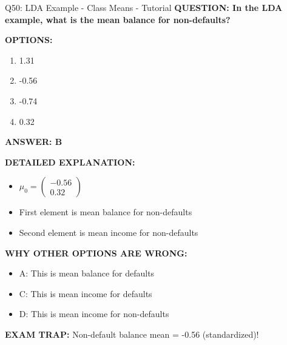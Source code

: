 \documentclass[8pt]{beamer}
\begin{document}
\begin{frame}{Q50: LDA Example - Class Means - Tutorial}
	\fontsize{6.5}{7.5}\selectfont
	\textbf{QUESTION: In the LDA example, what is the mean balance for non-defaults?}
	
	\vspace{0.1cm}
	\textbf{OPTIONS:}
	\begin{enumerate}
		\item 1.31
		\item -0.56
		\item -0.74
		\item 0.32
	\end{enumerate}
	
	\vspace{0.1cm}
	\textcolor{myblue}{\textbf{ANSWER: B}}
	
	\vspace{0.1cm}
	\textbf{DETAILED EXPLANATION:}
	\begin{itemize}
		\item $\mu_0 = \begin{pmatrix} -0.56 \\ 0.32 \end{pmatrix}$
		\item First element is mean balance for non-defaults
		\item Second element is mean income for non-defaults
	\end{itemize}
	
	\vspace{0.1cm}
	\textcolor{myred}{\textbf{WHY OTHER OPTIONS ARE WRONG:}}
	\begin{itemize}
		\item \textcolor{myred}{A:} This is mean balance for defaults
		\item \textcolor{myred}{C:} This is mean income for defaults
		\item \textcolor{myred}{D:} This is mean income for non-defaults
	\end{itemize}
	
	\textcolor{myred}{\textbf{EXAM TRAP:}} Non-default balance mean = \textcolor{myblue}{-0.56} (standardized)!
\end{frame}
\end{document}
